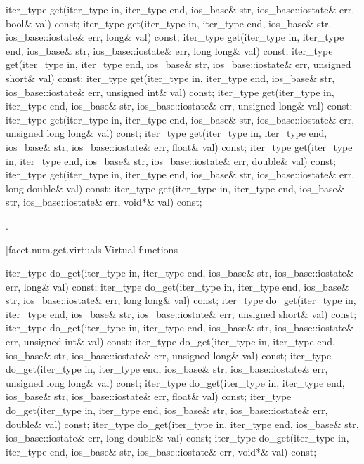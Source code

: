 %
\begin{itemdecl}
iter_type get(iter_type in, iter_type end, ios_base& str,
              ios_base::iostate& err, bool& val) const;
iter_type get(iter_type in, iter_type end, ios_base& str,
              ios_base::iostate& err, long& val) const;
iter_type get(iter_type in, iter_type end, ios_base& str,
              ios_base::iostate& err, long long& val) const;
iter_type get(iter_type in, iter_type end, ios_base& str,
              ios_base::iostate& err, unsigned short& val) const;
iter_type get(iter_type in, iter_type end, ios_base& str,
              ios_base::iostate& err, unsigned int& val) const;
iter_type get(iter_type in, iter_type end, ios_base& str,
              ios_base::iostate& err, unsigned long& val) const;
iter_type get(iter_type in, iter_type end, ios_base& str,
              ios_base::iostate& err, unsigned long long& val) const;
iter_type get(iter_type in, iter_type end, ios_base& str,
              ios_base::iostate& err, float& val) const;
iter_type get(iter_type in, iter_type end, ios_base& str,
              ios_base::iostate& err, double& val) const;
iter_type get(iter_type in, iter_type end, ios_base& str,
              ios_base::iostate& err, long double& val) const;
iter_type get(iter_type in, iter_type end, ios_base& str,
              ios_base::iostate& err, void*& val) const;
\end{itemdecl}

\begin{itemdescr}
\pnum
\returns
{}.
\end{itemdescr}

[facet.num.get.virtuals]{Virtual functions}

%
\begin{itemdecl}
iter_type do_get(iter_type in, iter_type end, ios_base& str,
                 ios_base::iostate& err, long& val) const;
iter_type do_get(iter_type in, iter_type end, ios_base& str,
                 ios_base::iostate& err, long long& val) const;
iter_type do_get(iter_type in, iter_type end, ios_base& str,
                 ios_base::iostate& err, unsigned short& val) const;
iter_type do_get(iter_type in, iter_type end, ios_base& str,
                 ios_base::iostate& err, unsigned int& val) const;
iter_type do_get(iter_type in, iter_type end, ios_base& str,
                 ios_base::iostate& err, unsigned long& val) const;
iter_type do_get(iter_type in, iter_type end, ios_base& str,
                 ios_base::iostate& err, unsigned long long& val) const;
iter_type do_get(iter_type in, iter_type end, ios_base& str,
                 ios_base::iostate& err, float& val) const;
iter_type do_get(iter_type in, iter_type end, ios_base& str,
                 ios_base::iostate& err, double& val) const;
iter_type do_get(iter_type in, iter_type end, ios_base& str,
                 ios_base::iostate& err, long double& val) const;
iter_type do_get(iter_type in, iter_type end, ios_base& str,
                 ios_base::iostate& err, void*& val) const;
\end{itemdecl}

